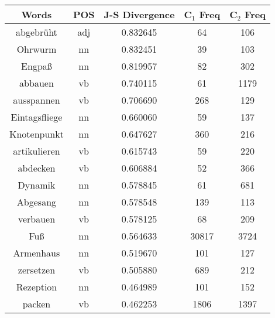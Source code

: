 \begin{table}
\centering
\begin{tabular}{ccccc} 
\toprule
\textbf{ Words }   & \textbf{POS } & \textbf{ J-S Divergence } & \textbf{ C$_1$ Freq } & \textbf{ C$_2$ Freq }  \\ 
\midrule
abgebrüht          & adj           & 0.832645           & 64                 & 106                 \\
Ohrwurm            & nn            & 0.832451           & 39                 & 103                 \\
Engpaß             & nn            & 0.819957           & 82                 & 302                 \\
abbauen            & vb            & 0.740115           & 61                 & 1179                \\
ausspannen         & vb            & 0.706690           & 268                & 129                 \\
Eintagsfliege      & nn            & 0.660060           & 59                 & 137                 \\
Knotenpunkt        & nn            & 0.647627           & 360                & 216                 \\
artikulieren       & vb            & 0.615743           & 59                 & 220                 \\
abdecken           & vb            & 0.606884           & 52                 & 366                 \\
Dynamik            & nn            & 0.578845           & 61                 & 681                 \\
Abgesang           & nn            & 0.578548           & 139                & 113                 \\
verbauen           & vb            & 0.578125           & 68                 & 209                 \\
Fuß                & nn            & 0.564633           & 30817              & 3724                \\
Armenhaus          & nn            & 0.519670           & 101                & 127                 \\
zersetzen          & vb            & 0.505880           & 689                & 212                 \\
Rezeption          & nn            & 0.464989           & 101                & 152                 \\
packen             & vb            & 0.462253           & 1806               & 1397                \\

\end{tabular}
\end{table}
